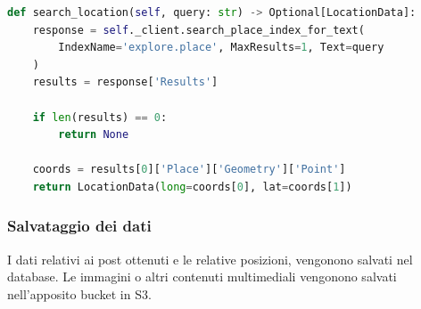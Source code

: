 \begin{lstlisting}[language=Python, caption=Metodo principale]
def search_location(self, query: str) -> Optional[LocationData]:
    response = self._client.search_place_index_for_text(
        IndexName='explore.place', MaxResults=1, Text=query
    )
    results = response['Results']
    
    if len(results) == 0:
        return None
    
    coords = results[0]['Place']['Geometry']['Point']
    return LocationData(long=coords[0], lat=coords[1])
\end{lstlisting}
    

\subsubsection{Salvataggio dei dati}
I dati relativi ai post ottenuti e le relative posizioni, vengonono salvati nel database.
Le immagini o altri contenuti multimediali vengonono salvati nell'apposito bucket in S3.
